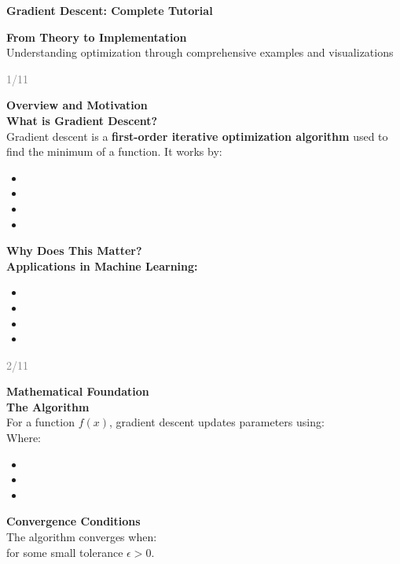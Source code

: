 \documentclass[11pt]{article}
\newcommand{\slidetitle}[1]{%
  \begin{center}
  \textcolor{accentcolor}{\huge\textbf{#1}}
  \end{center}
  \vspace{0.5cm}
}
\begin{document}
\slidetitle{Gradient Descent: Complete Tutorial}

\textbf{\huge From Theory to Implementation}\\[0.5cm]
Understanding optimization through comprehensive examples and visualizations

\vfill
\begin{flushright}
\textcolor{gray}{\small 1/11}
\end{flushright}

\newpage

\textbf{\huge Overview and Motivation}\\[0.5cm]
\textbf{\Large What is Gradient Descent?}\\[0.3cm]
Gradient descent is a \textbf{first-order iterative optimization algorithm} used to find the minimum of a function. It works by:
\begin{itemize}
\item \1
\item \1
\item \1
\item \1
\end{itemize}
\textbf{\Large Why Does This Matter?}\\[0.3cm]
\textbf{Applications in Machine Learning:}
\begin{itemize}
\item \1
\item \1
\item \1
\item \1
\end{itemize}

\vfill
\begin{flushright}
\textcolor{gray}{\small 2/11}
\end{flushright}

\newpage

\textbf{\huge Mathematical Foundation}\\[0.5cm]
\textbf{\Large The Algorithm}\\[0.3cm]
For a function $f(x)$, gradient descent updates parameters using:
\\[\1\\]
Where:
\begin{itemize}
\item \1
\item \1
\item \1
\end{itemize}
\textbf{\Large Convergence Conditions}\\[0.3cm]
The algorithm converges when:
\\[\1\\]
for some small tolerance $\epsilon > 0$.
\end{document}
